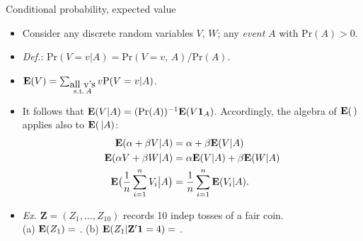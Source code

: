 
\begin{frame}{Conditional probability, expected value}
  \begin{itemize}
  \item<1-> Consider any discrete random variables $V$, $W$;  any
    \textit{event} $A$ with $\mathrm{Pr}(A) >0 $. 
  \item<1-> \textit{Def.}: $\mathrm{Pr}(V= v | A) = \mathrm{Pr}(V=v,\, A) /\mathrm{Pr}(A) $. 
  \item<2->  $\mathbf{E}(V) = \sum_{\substack{\mbox{all v's}\\
        \mathrm{s.t.}\, A}} v\mathrm{P}(V=v | A) $.
  \item<3->  It follows that $\mathbf{E}  (V | A) = (\mathrm{Pr}(A))^{-1} \mathbf{E}
    (V \mathbf{1}_{A} )$.  Accordingly, the algebra of $\mathbf{E} ( \, ) $
    applies also to $\mathbf{E}(\, |A) $:\\
    \begin{align*}
     \mathbf{E}(\alpha + \beta V| A) &=
    \alpha + \beta\mathbf{E}(V| A) \\
     \mathbf{E}(\alpha V + \beta W | A) &=  \alpha \mathbf{E}(V|A) + \beta \mathbf{E}(W|A)
      \\
      \mathbf{E}\big(\frac{1}{n} \sum_{i=1}^n V_i \big| A \big) &= \frac{1}{n} \sum_{i=1}^n \mathbf{E} (V_i|A).
    \end{align*}
\item<4-> \textit{Ex.} $\mathbf{Z} = (Z_{1}, \ldots, Z_{10}) $ records
  10 indep tosses of a fair coin.\\ (a) $\mathbf{E} (Z_{1}) = $
  \underline{\hspace{2em}}. (b) $\mathbf{E} (Z_{1} | \mathbf{Z}'\mathbf{1}=4)
  =$ \underline{\hspace{2em}}.

  \end{itemize}
\end{frame}


